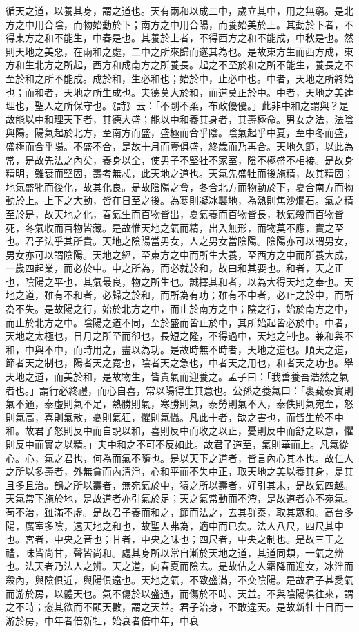 循天之道，以養其身，謂之道也。天有兩和以成二中，歲立其中，用之無窮。是北方之中用合陰，而物始動於下；南方之中用合陽，而養始美於上。其動於下者，不得東方之和不能生，中春是也。其養於上者，不得西方之和不能成，中秋是也。然則天地之美惡，在兩和之處，二中之所來歸而遂其為也。是故東方生而西方成，東方和生北方之所起，西方和成南方之所養長。起之不至於和之所不能生，養長之不至於和之所不能成。成於和，生必和也；始於中，止必中也。中者，天地之所終始也；而和者，天地之所生成也。夫德莫大於和，而道莫正於中。中者，天地之美達理也，聖人之所保守也。《詩》云：「不剛不柔，布政優優。」此非中和之謂與？是故能以中和理天下者，其德大盛；能以中和養其身者，其壽極命。男女之法，法陰與陽。陽氣起於北方，至南方而盛，盛極而合乎陰。陰氣起乎中夏，至中冬而盛，盛極而合乎陽。不盛不合，是故十月而壹俱盛，終歲而乃再合。天地久節，以此為常，是故先法之內矣，養身以全，使男子不堅牡不家室，陰不極盛不相接。是故身精明，難衰而堅固，壽考無忒，此天地之道也。天氣先盛牡而後施精，故其精固；地氣盛牝而後化，故其化良。是故陰陽之會，冬合北方而物動於下，夏合南方而物動於上。上下之大動，皆在日至之後。為寒則凝冰襲地，為熱則焦沙爛石。氣之精至於是，故天地之化，春氣生而百物皆出，夏氣養而百物皆長，秋氣殺而百物皆死，冬氣收而百物皆藏。是故惟天地之氣而精，出入無形，而物莫不應，實之至也。君子法乎其所貴。天地之陰陽當男女，人之男女當陰陽。陰陽亦可以謂男女，男女亦可以謂陰陽。天地之經，至東方之中而所生大養，至西方之中而所養大成，一歲四起業，而必於中。中之所為，而必就於和，故曰和其要也。和者，天之正也，陰陽之平也，其氣最良，物之所生也。誠擇其和者，以為大得天地之奉也。天地之道，雖有不和者，必歸之於和，而所為有功；雖有不中者，必止之於中，而所為不失。是故陽之行，始於北方之中，而止於南方之中；陰之行，始於南方之中，而止於北方之中。陰陽之道不同，至於盛而皆止於中，其所始起皆必於中。中者，天地之太極也，日月之所至而卻也，長短之隆，不得過中，天地之制也。兼和與不和，中與不中，而時用之，盡以為功。是故時無不時者，天地之道也。順天之道，節者天之制也，陽者天之寬也，陰者天之急也，中者天之用也，和者天之功也。舉天地之道，而美於和，是故物生，皆貴氣而迎養之。孟子曰：「我善養吾浩然之氣者也。」謂行必終禮，而心自喜，常以陽得生其意也。公孫之養氣曰：「裹藏泰實則氣不通，泰虛則氣不足，熱勝則氣，寒勝則氣，泰勞則氣不入，泰佚則氣宛至，怒則氣高，喜則氣散，憂則氣狂，懼則氣懾。凡此十者，缺之害也，而皆生於不中和。故君子怒則反中而自說以和，喜則反中而收之以正，憂則反中而舒之以意，懼則反中而實之以精。」夫中和之不可不反如此。故君子道至，氣則華而上。凡氣從心。心，氣之君也，何為而氣不隨也。是以天下之道者，皆言內心其本也。故仁人之所以多壽者，外無貪而內清淨，心和平而不失中正，取天地之美以養其身，是其且多且治。鶴之所以壽者，無宛氣於中，猿之所以壽者，好引其末，是故氣四越。天氣常下施於地，是故道者亦引氣於足；天之氣常動而不滯，是故道者亦不宛氣。苟不治，雖滿不虛。是故君子養而和之，節而法之，去其群泰，取其眾和。高台多陽，廣室多陰，遠天地之和也，故聖人弗為，適中而已矣。法人八尺，四尺其中也。宮者，中央之音也；甘者，中央之味也；四尺者，中央之制也。是故三王之禮，味皆尚甘，聲皆尚和。處其身所以常自漸於天地之道，其道同類，一氣之辨也。法天者乃法人之辨。天之道，向春夏而陰去。是故佔之人霜降而迎女，冰泮而殺內，與陰俱近，與陽俱遠也。天地之氣，不致盛滿，不交陰陽。是故君子甚愛氣而游於房，以體天也。氣不傷於以盛通，而傷於不時、天並。不與陰陽俱往來，謂之不時；恣其欲而不顧天數，謂之天並。君子治身，不敢違天。是故新牡十日而一游於房，中年者倍新牡，始衰者倍中年，中衰